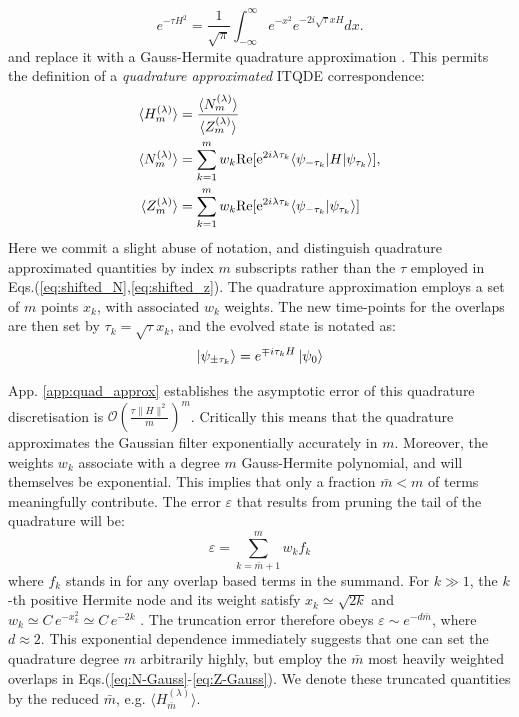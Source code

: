 \documentclass[reprint, aps,prx,showpacs,bibfootnote,preprintnumbers, mathtools, superscriptaddress, amsmath,amssymb]{revtex4-2}
\begin{document}
\begin{equation}
e^{-\tau H^2} = \frac{1}{\sqrt{\pi}} \int_{-\infty}^\infty e^{-x^2} e^{-2i\sqrt{\tau}x H} dx.
\end{equation}
and replace it with a Gauss-Hermite quadrature approximation \cite{NIST:DLMF}. This permits the definition of a \textit{quadrature approximated} ITQDE correspondence:
\begin{align}
\label{eq:ITQDE-Gauss}
\langle H_m^{(\lambda)}\rangle &= \frac{\langle N_m^{(\lambda)}\rangle}{\langle Z_m^{(\lambda)} \rangle} \\
\label{eq:N-Gauss}
 \langle N_m^{(\lambda)} \rangle &= \sum_{k=1}^m w_k \mathrm{Re}[{\rm e}^{2i \lambda \tau_k} \langle \psi_{-\tau_k} | H | \psi_{\tau_k} \rangle], \\
 \label{eq:Z-Gauss}
\langle Z_m^{(\lambda)}\rangle &= \sum_{k=1}^m w_k \mathrm{Re}[{\rm e}^{2i \lambda \tau_k} \langle \psi_{-\tau_k} | \psi_{\tau_k} \rangle]
\end{align}
 Here we commit a slight abuse of notation, and distinguish quadrature approximated quantities by index $m$ subscripts rather than the $\tau$ employed in Eqs.(\ref{eq:shifted_N},\ref{eq:shifted_z}). The quadrature approximation employs a set of $m$ points $x_k$, with associated $w_k$ weights. The new time-points for the overlaps are then set by $\tau_k=\sqrt{\tau}x_k$, and the evolved state is notated as:
 \begin{equation}
     \ket{\psi_{\pm \tau_k}}= e^{\mp i\tau_k H}\ket{\psi_0}
 \end{equation}

App. \ref{app:quad_approx} establishes the asymptotic error of this quadrature discretisation is $ \mathcal{O}(\frac{\tau \| H \|^{2}}{m})^m$. Critically this means that the quadrature approximates the Gaussian filter exponentially accurately in $m$. Moreover, the weights $w_k$ associate with a degree $m$ Gauss-Hermite polynomial, and will themselves be exponential. This implies that only a fraction $\bar{m} < m$ of terms meaningfully contribute. The error $\varepsilon$ that results from pruning the tail of the quadrature will be:
\begin{equation}
\label{eq:quad-error}
   \varepsilon= \sum_{k=\bar{m}+1}^m w_k f_k
\end{equation}
where $f_k$ stands in for any overlap based terms in the summand. For $k\gg 1$, the $k$-th positive Hermite node and its weight satisfy
$x_k \simeq \sqrt{2k}$  and  $w_k \simeq C\,e^{-x_k^{2}}\simeq C\,e^{-2k}$ \cite{NIST:DLMF}. The truncation error therefore obeys $\varepsilon \sim e^{-d\bar m}$, where $d\approx 2$. This exponential dependence immediately suggests that one can set the quadrature degree $m$ arbitrarily highly, but employ the $\bar{m}$ most heavily weighted overlaps in Eqs.(\ref{eq:N-Gauss}-\ref{eq:Z-Gauss}). We denote these truncated quantities by the reduced $\bar{m}$, e.g. $\langle H_{\bar{m}}^{(\lambda)}\rangle$.
\end{document}
